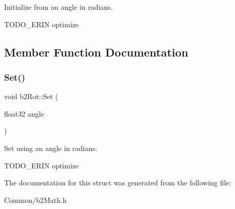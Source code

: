 Initialize from an angle in radians. 

T\+O\+D\+O\+\_\+\+E\+R\+IN optimize 

\subsection{Member Function Documentation}
\mbox{\label{structb2Rot_acde9186de0a4a7397bf8ef714408ad60}} 
\subsubsection{\texorpdfstring{Set()}{Set()}}
{\footnotesize\ttfamily void b2\+Rot\+::\+Set (\begin{DoxyParamCaption}\item[{float32}]{angle }\end{DoxyParamCaption})\hspace{0.3cm}{\ttfamily [inline]}}



Set using an angle in radians. 

T\+O\+D\+O\+\_\+\+E\+R\+IN optimize 

The documentation for this struct was generated from the following file\+:\begin{DoxyCompactItemize}
\item 
Common/b2\+Math.\+h\end{DoxyCompactItemize}
